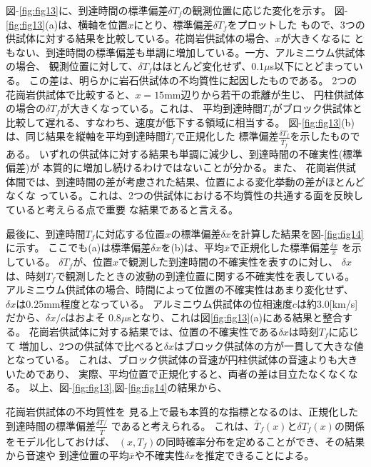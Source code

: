 図-\ref{fig:fig13}に、到達時間の標準偏差$\delta T_f$の観測位置に応じた変化を示す。
図-\ref{fig:fig13}(a)は、横軸を位置$x$にとり、標準偏差$\delta T_f$をプロットした
もので、3つの供試体に対する結果を比較している。花崗岩供試体の場合、$x$が大きくなるに
ともない、到達時間の標準偏差も単調に増加している。一方、アルミニウム供試体の場合、
観測位置に対して、$\delta T_f$はほとんど変化せず、0.1$\mu$s以下にとどまっている。
この差は、明らかに岩石供試体の不均質性に起因したものである。
2つの花崗岩供試体で比較すると、$x=15$mm辺りから若干の乖離が生じ、
円柱供試体の場合の$\delta T_f$が大きくなっている。これは、
平均到達時間$T_f$がブロック供試体と比較して遅れる、すなわち、速度が低下する領域に相当する。
図-\ref{fig:fig13}(b)は、同じ結果を縦軸を平均到達時間$\bar T_f$で正規化した
標準偏差$\frac{\delta T_f}{\bar{T}_f}$を示したものである。
いずれの供試体に対する結果も単調に減少し、到達時間の不確実性(標準偏差)が
本質的に増加し続けるわけではないことが分かる。また、
花崗岩供試体間では、到達時間の差が考慮された結果、位置による変化挙動の差がほとんどなくな
っている。これは、2つの供試体における不均質性の共通する面を反映していると考えらる点で重要
な結果であると言える。

最後に、到達時間$T_f$に対応する位置$x$の標準偏差$\delta x$を計算した結果を図-\ref{fig:fig14}に示す。
ここでも(a)は標準偏差$\delta x$を(b)は、平均$\bar{x}$で正規化した標準偏差$\frac{\delta x}{\bar{x}}$
を示している。
$\delta T_f$が、位置$x$で観測した到達時間の不確実性を表すのに対し、
$\delta x$は、時刻$T_f$で観測したときの波動の到達位置に関する不確実性を表している。
アルミニウム供試体の場合、時間によって位置の不確実性はあまり変化せず、
$\delta x$は0.25mm程度となっている。
アルミニウム供試体の位相速度$c$は約3.0[km/s]だから、$\delta x/c$はおよそ
$0.8\mu$sとなり、これは図\ref{fig:fig13}(a)にある結果と整合する。
花崗岩供試体に対する結果では、位置の不確実性である$\delta x$は時刻$T_f$に応じて
増加し、2つの供試体で比べると$\delta x$はブロック供試体の方が一貫して大きな値となっている。
これは、ブロック供試体の音速が円柱供試体の音速よりも大きいためであり、
実際、平均位置で正規化すると、両者の差は目立たなくなくなる。
以上、図-\ref{fig:fig13},図-\ref{fig:fig14}の結果から、

花崗岩供試体の不均質性を
見る上で最も本質的な指標となるのは、正規化した到達時間の標準偏差$\frac{\delta T/}{\bar T}$
であると考えられる。
これは、$\bar{T}_f(x)$と$\delta T_f(x)$の関係をモデル化しておけば、
$(x,T_f)$の同時確率分布を定めることができ、その結果から音速や
到達位置の平均$\bar{x}$や不確実性$\delta x$を推定できることによる。

